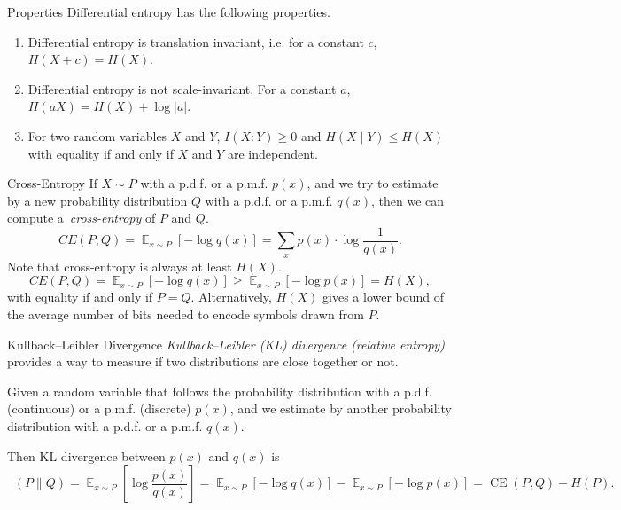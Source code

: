 \documentclass[aspectratio=169]{beamer}
\DeclareMathOperator*{\E}{\mathbb{E}}
\DeclareMathOperator{\KL}{D_{KL}}
\DeclareMathOperator{\CE}{CE}
\begin{document}
\begin{frame}{Properties}
    Differential entropy has the following properties.
    \begin{enumerate}
        \item
        Differential entropy is translation invariant, i.e. for a constant $c$, $H(X+c)=H(X)$.


        \item     Differential entropy is not scale-invariant. For a constant $a$,
        $H(aX)=H(X)+\log|a|$.


        \item For two random variables $X$ and $Y$, $I(X:Y) \ge 0$ and $H(X\mid Y)\leq H(X)$ with equality if and only if $X$ and $Y$ are independent.
    \end{enumerate}
\end{frame}

\begin{frame}{Cross-Entropy}
If $X\sim P$ with a p.d.f. or a p.m.f. $p(x)$, and we try to estimate by a new probability distribution $Q$ with a p.d.f. or a p.m.f. $q(x)$, then we can compute a~\emph{cross-entropy} of $P$ and $Q$.
\[
CE(P,Q) = \E_{x \sim P} [- \log q(x)] = \sum_{x} p(x)\cdot \log\frac{1}{q(x)}.
\]
Note that cross-entropy is always at least $H(X)$.
\[
CE(P, Q) = \E_{x \sim P} [- \log q(x)] \geq \E_{x \sim P} [- \log p(x)] = H(X),
\]
with equality if and only if $P = Q$.
Alternatively, $H(X)$ gives a lower bound of the average number of bits needed to encode symbols drawn from $P$.
\end{frame}

\begin{frame}{Kullback–Leibler Divergence}
\emph{Kullback–Leibler (KL) divergence (relative entropy)} provides a way to measure if two distributions are close together or not.\medskip


Given a random variable that follows the probability distribution with a p.d.f. (continuous) or a p.m.f. (discrete) $p(x)$, and we estimate by another probability distribution with a p.d.f. or a p.m.f. $q(x)$. \medskip


Then KL divergence between $p(x)$ and $q(x)$ is
\[
\KL(P\parallel Q) = \E_{x \sim P} \left[ \log \frac{p(x)}{q(x)} \right] =
\E_{x \sim P} [- \log q(x)] -  \E_{x \sim P} [- \log p(x)] = \CE(P,Q) - H(P).
\]
\end{frame}
\end{document}
